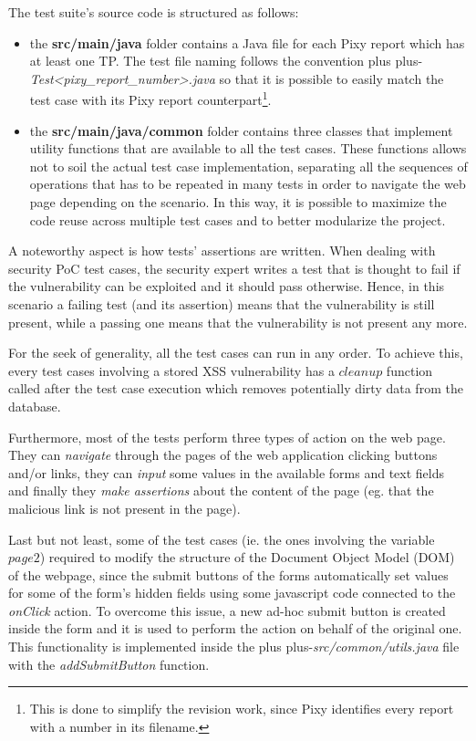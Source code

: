 \documentclass{sig-alternate-05-2015}
\newcommand\lword[1]{\leavevmode\nobreak\hskip0pt plus\linewidth\penalty50\hskip0pt plus-\linewidth\nobreak#1}
\begin{document}
The test suite's source code is structured as follows:
\begin{itemize}
    \item the \textbf{src/main/java} folder contains a Java file for each Pixy report which
        has at least one TP. The test file naming follows the convention
        \lword{\emph{Test<pixy\_report\_number>.java}} so that it is possible to easily match the test
        case with its Pixy report counterpart\footnote{This is done to simplify the revision work,
        since Pixy identifies every report with a number in its filename.}.
    \item the \textbf{src/main/java/common} folder contains three classes that implement
        utility functions that are available to all the test cases. These functions
        allows not to soil the actual test case implementation, separating all the
        sequences of operations that has to be repeated in many tests in order to navigate
        the web page depending on the scenario. In this way, it is possible to maximize
        the code reuse across multiple test cases and to better modularize the project.
\end{itemize}
A noteworthy aspect is how tests' assertions are written. When dealing with
security PoC test cases, the security expert writes a test that is thought to fail
if the vulnerability can be exploited and it should pass otherwise. Hence, in this scenario
a failing test (and its assertion) means that the vulnerability is still present,
while a passing one means that the vulnerability is not present any more.

For the seek of generality, all the test cases can run in any order. To achieve this,
every test cases involving a stored XSS vulnerability has a $cleanup$ function called
after the test case execution which removes potentially dirty data from the database.

Furthermore, most of the tests perform three types of action on the web page.
They can \emph{navigate} through the pages of the web application clicking buttons and/or links,
they can \emph{input} some values in the available forms and text fields and finally they
\emph{make assertions} about the content of the page (eg. that the malicious link is not
present in the page).

Last but not least, some of the test cases (ie. the ones involving the variable $page2$)
required to modify the structure of the Document Object Model (DOM) of the webpage, since
the submit buttons of the forms automatically set values for some of the form's hidden
fields using some javascript code connected to the \emph{onClick} action.
To overcome this issue, a new ad-hoc submit button is created inside the form
and it is used to perform the action on behalf of the original one. This functionality
is implemented inside the \lword{\emph{src/common/utils.java}} file with the \emph{addSubmitButton}
function.
\end{document}
